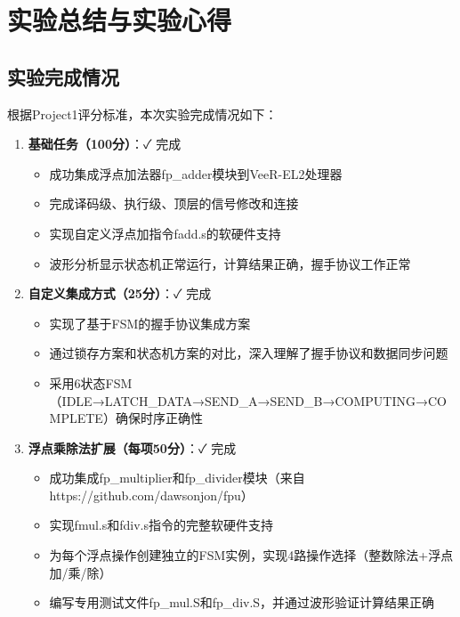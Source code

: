 \documentclass[12pt,a4paper]{article}
\begin{document}
\clearpage
\section{实验总结与实验心得}

\subsection{实验完成情况}

根据Project1评分标准，本次实验完成情况如下：

\begin{enumerate}[itemsep=5pt, parsep=3pt]
    \item \textbf{基础任务（100分）}：✓ 完成
    \begin{itemize}[itemsep=0pt, parsep=3pt]
        \item 成功集成浮点加法器fp\_adder模块到VeeR-EL2处理器
        \item 完成译码级、执行级、顶层的信号修改和连接
        \item 实现自定义浮点加指令fadd.s的软硬件支持
        \item 波形分析显示状态机正常运行，计算结果正确，握手协议工作正常
    \end{itemize}
    
    \item \textbf{自定义集成方式（25分）}：✓ 完成
    \begin{itemize}[itemsep=0pt, parsep=3pt]
        \item 实现了基于FSM的握手协议集成方案
        \item 通过锁存方案和状态机方案的对比，深入理解了握手协议和数据同步问题
        \item 采用6状态FSM（IDLE→LATCH\_DATA→SEND\_A→SEND\_B→COMPUTING→COMPLETE）确保时序正确性
    \end{itemize}
    
    \item \textbf{浮点乘除法扩展（每项50分）}：✓ 完成
    \begin{itemize}[itemsep=0pt, parsep=3pt]
        \item 成功集成fp\_multiplier和fp\_divider模块（来自https://github.com/dawsonjon/fpu）
        \item 实现fmul.s和fdiv.s指令的完整软硬件支持
        \item 为每个浮点操作创建独立的FSM实例，实现4路操作选择（整数除法+浮点加/乘/除）
        \item 编写专用测试文件fp\_mul.S和fp\_div.S，并通过波形验证计算结果正确
    \end{itemize}
    

\end{enumerate}
\end{document}
